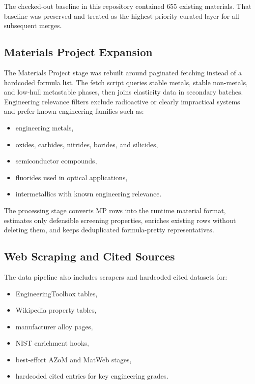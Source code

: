 \documentclass[11pt,a4paper]{article}
\begin{document}
The checked-out baseline in this repository contained 655 existing materials. That baseline was preserved and treated as the highest-priority curated layer for all subsequent merges.

\subsection{Materials Project Expansion}

The Materials Project stage was rebuilt around paginated fetching instead of a hardcoded formula list. The fetch script queries stable metals, stable non-metals, and low-hull metastable phases, then joins elasticity data in secondary batches. Engineering relevance filters exclude radioactive or clearly impractical systems and prefer known engineering families such as:

\begin{itemize}[leftmargin=*]
  \item engineering metals,
  \item oxides, carbides, nitrides, borides, and silicides,
  \item semiconductor compounds,
  \item fluorides used in optical applications,
  \item intermetallics with known engineering relevance.
\end{itemize}

The processing stage converts MP rows into the runtime material format, estimates only defensible screening properties, enriches existing rows without deleting them, and keeps deduplicated formula-pretty representatives.

\subsection{Web Scraping and Cited Sources}

The data pipeline also includes scrapers and hardcoded cited datasets for:

\begin{itemize}[leftmargin=*]
  \item EngineeringToolbox tables,
  \item Wikipedia property tables,
  \item manufacturer alloy pages,
  \item NIST enrichment hooks,
  \item best-effort AZoM and MatWeb stages,
  \item hardcoded cited entries for key engineering grades.
\end{itemize}
\end{document}
